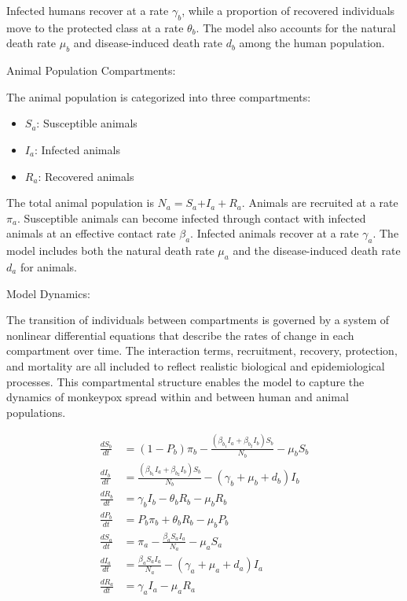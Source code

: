 \documentclass[10pt]{NSP1}
\begin{document}
Infected humans recover at a rate \(\gamma_{b}\), while a proportion of recovered individuals move to the protected class at a rate \(\theta_{b}\). The model also accounts for the natural death rate \(\mu_{b}\) and disease-induced death rate \(d_{b}\) among the human population.

Animal Population Compartments:

The animal population is categorized into three compartments:

\begin{itemize}
\item
  \(S_{a}\): Susceptible animals
\item
  \(I_{a}\): Infected animals
\item
  \(R_{a}\): Recovered animals
\end{itemize}

The total animal population is \(N_{a} = S_{a}\)+\(I_{a} + R_{a}\). Animals are recruited at a rate \(\pi_{a}\). Susceptible animals can become infected through contact with infected animals at an effective contact rate \(\beta_{a}\). Infected animals recover at a rate \(\gamma_{a}\). The model includes both the natural death rate \(\mu_{a}\) and the disease-induced death rate \(d_{a}\) for animals.

Model Dynamics:

The transition of individuals between compartments is governed by a system of nonlinear differential equations that describe the rates of change in each compartment over time. The interaction terms, recruitment, recovery, protection, and mortality are all included to reflect realistic biological and epidemiological processes. This compartmental structure enables the model to capture the dynamics of monkeypox spread within and between human and animal populations.

\begin{equation}
\begin{aligned}
\frac{dS_{b}}{dt} &= \left( 1 - P_{b} \right)\pi_{b} - \frac{\left( \beta_{b_{1}}I_{a} + \beta_{b_{2}}I_{b} \right)S_{b}}{N_{b}} - \mu_{b}S_{b} \\
\frac{dI_{b}}{dt} &= \frac{\left( \beta_{b_{1}}I_{a} + \beta_{b_{2}}I_{b} \right)S_{b}}{N_{b}} - \left( \gamma_{b} + \mu_{b} + d_{b} \right)I_{b} \\
\frac{dR_{b}}{dt} &= \gamma_{b}I_{b} - \theta_{b}R_{b} - \mu_{b}R_{b} \\
\frac{dP_{b}}{dt} &= P_{b}\pi_{b} + \theta_{b}R_{b} - \mu_{b}P_{b} \\
\frac{dS_{a}}{dt} &= \pi_{a} - \frac{\beta_{a}S_{a}I_{a}}{N_{a}} - \mu_{a}S_{a} \\
\frac{dI_{a}}{dt} &= \frac{\beta_{a}S_{a}I_{a}}{N_{a}} - \left( \gamma_{a} + \mu_{a} + d_{a} \right)I_{a} \\
\frac{dR_{a}}{dt} &= \gamma_{a}I_{a} - \mu_{a}R_{a}
\end{aligned}
\end{equation}
\end{document}
